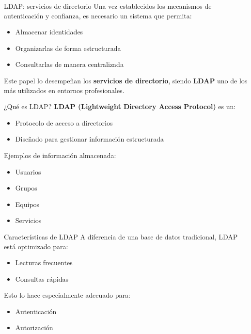 \documentclass{beamer}
\begin{document}
\begin{frame}{LDAP: servicios de directorio}
Una vez establecidos los mecanismos de autenticación y confianza, es necesario un sistema que permita:
\begin{itemize}
    \item Almacenar identidades
    \item Organizarlas de forma estructurada
    \item Consultarlas de manera centralizada
\end{itemize}

\vspace{0.3cm}
Este papel lo desempeñan los \textbf{servicios de directorio}, siendo \textbf{LDAP} uno de los más utilizados en entornos profesionales.
\end{frame}

\begin{frame}{¿Qué es LDAP?}
\textbf{LDAP (Lightweight Directory Access Protocol)} es un:
\begin{itemize}
    \item Protocolo de acceso a directorios
    \item Diseñado para gestionar información estructurada
\end{itemize}

\vspace{0.3cm}
Ejemplos de información almacenada:
\begin{itemize}
    \item Usuarios
    \item Grupos
    \item Equipos
    \item Servicios
\end{itemize}
\end{frame}

\begin{frame}{Características de LDAP}
A diferencia de una base de datos tradicional, LDAP está optimizado para:
\begin{itemize}
    \item Lecturas frecuentes
    \item Consultas rápidas
\end{itemize}

\vspace{0.3cm}
Esto lo hace especialmente adecuado para:
\begin{itemize}
    \item Autenticación
    \item Autorización
\end{itemize}
\end{frame}
\end{document}

